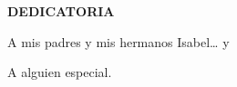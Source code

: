 \newpage
\thispagestyle{plain}

\begin{center}
  \large{\textbf{DEDICATORIA}}
\end{center}

A mis padres  y mis hermanos Isabel{\ldots} y

\vskip 0.5cm

A alguien especial.

\endinput 
